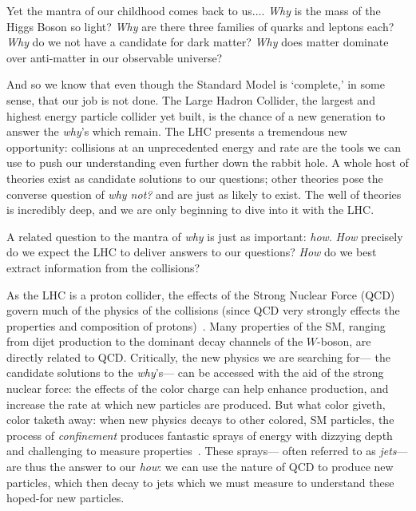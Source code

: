 Yet the mantra of our childhood comes back to us.... \textit{Why} is the mass of the Higgs Boson so light? \textit{Why} are there three families of quarks and leptons each? \textit{Why} do we not have a candidate for dark matter? \textit{Why} does matter dominate over anti-matter in our observable universe?

And so we know that even though the Standard Model is `complete,' in some sense, that our job is not done. The Large Hadron Collider, the largest and highest energy particle collider yet built, is the chance of a new generation to answer the \textit{why}'s which remain. The LHC presents a tremendous new opportunity: collisions at an unprecedented energy and rate are the tools we can use to push our understanding even further down the rabbit hole. A whole host of theories exist as candidate solutions to our questions; other theories pose the converse question of \textit{why not?} and are just as likely to exist. The well of theories is incredibly deep, and we are only beginning to dive into it with the LHC.

A related question to the mantra of \textit{why} is just as important: \textit{how}. \textit{How} precisely do we expect the LHC to deliver answers to our questions? \textit{How} do we best extract information from the collisions?

As the LHC is a proton collider, the effects of the Strong Nuclear Force (QCD) govern much of the physics of the collisions (since QCD very strongly effects the properties and composition of protons)~\cite{Politzer:1973fx,Gross:1973ju,Gross:1973id}. Many properties of the SM, ranging from dijet production to the dominant decay channels of the $W$-boson, are directly related to QCD. Critically, the new physics we are searching for--- the candidate solutions to the \textit{why}'s--- can be accessed with the aid of the strong nuclear force: the effects of the color charge can help enhance production, and increase the rate at which new particles are produced. But what color giveth, color taketh away: when new physics decays to other colored, SM particles, the process of \textit{confinement} produces fantastic sprays of energy with dizzying depth and challenging to measure properties~\cite{Wilson:1974sk}. These sprays--- often referred to as \textit{jets}--- are thus the answer to our \textit{how}: we can use the nature of QCD to produce new particles, which then decay to jets which we must measure to understand these hoped-for new particles.

